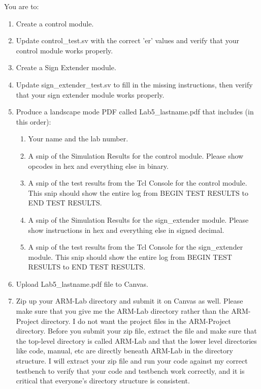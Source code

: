 You are to:
\begin{enumerate}
\item Create a control module.
\item Update control\_test.sv with the correct 'er' values and verify that your control module works properly.
\item Create a Sign Extender module.
\item Update sign\_extender\_test.sv to fill in the missing instructions, then verify that your sign extender module works properly.
\item Produce a landscape mode PDF called Lab5\_lastname.pdf that includes (in this order):
\begin{enumerate}
	\item Your name and the lab number.
	\item A snip of the Simulation Results for the control module.  Please show opcodes in hex and everything else in binary.  
	\item A snip of the test results from the Tcl Console for the control module.  This snip should show the entire log from BEGIN TEST RESULTS to END TEST RESULTS.
	\item A snip of the Simulation Results for the sign\_extender module.  Please show instructions in hex and everything else in signed decimal.  
	\item A snip of the test results from the Tcl Console for the sign\_extender module.  This snip should show the entire log from BEGIN TEST RESULTS to END TEST RESULTS.	
\end{enumerate}
\item Upload Lab5\_lastname.pdf file to Canvas.
\item Zip up your ARM-Lab directory and submit it on Canvas as well.  Please make sure that you give me the ARM-Lab directory rather than the ARM-Project directory.  I do not want the project files in the ARM-Project directory.  Before you submit your zip file, extract the file and make sure that the top-level directory is called ARM-Lab and that the lower level directories like code, manual, etc are directly beneath ARM-Lab in the directory structure.  I will extract your zip file and run your code against my correct testbench to verify that your code and testbench work correctly, and it is critical that everyone's directory structure is consistent.
\end{enumerate} 